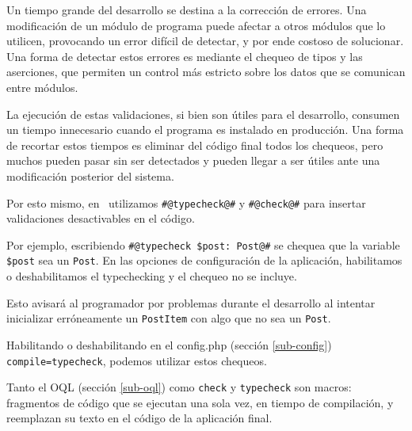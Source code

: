Un tiempo grande del desarrollo se destina a la corrección de errores. Una modificación de un módulo de programa puede afectar a otros módulos que lo utilicen, provocando un error difícil de detectar, y por ende costoso de solucionar. Una forma de detectar estos errores es mediante el chequeo de tipos y las aserciones, que permiten un control más estricto sobre los datos que se comunican entre módulos.

La ejecución de estas validaciones, si bien son útiles para el desarrollo, consumen un tiempo innecesario cuando el programa es instalado en producción. Una forma de recortar estos tiempos es eliminar del código final todos los chequeos, pero muchos pueden pasar sin ser detectados y pueden llegar a ser útiles ante una modificación posterior del sistema.

Por esto mismo, en \PWB\ utilizamos \verb'#@typecheck@#' y \verb'#@check@#' para insertar validaciones desactivables en el código.

Por ejemplo, escribiendo \verb"#@typecheck $post: Post@#" se chequea que la variable \verb"$post"
sea un \verb'Post'. En las opciones de configuración de la aplicación, habilitamos o deshabilitamos el typechecking y el chequeo no se incluye.


Esto avisará al programador por problemas durante el desarrollo al intentar inicializar erróneamente un \verb"PostItem" con algo que no sea un \verb'Post'.

Habilitando o deshabilitando en el config.php (sección \ref{sub-config}) \verb'compile=typecheck', podemos utilizar estos chequeos.

Tanto el OQL (sección \ref{sub-oql}) como \verb'check' y \verb'typecheck' son macros: fragmentos de código que se ejecutan una sola vez, en tiempo de compilación, y reemplazan su texto en el código de la aplicación final.

